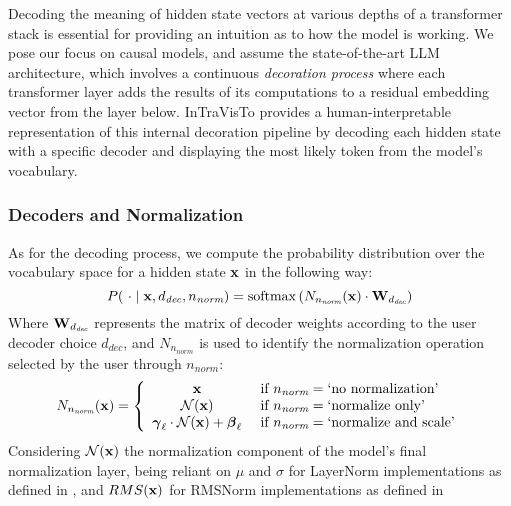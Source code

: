 Decoding the meaning of hidden state vectors at various depths of a transformer stack is essential for providing an intuition as to how the model is working.
We pose our focus on causal models, and assume the state-of-the-art LLM architecture, which involves a continuous \emph{decoration process} where each transformer layer adds the results of its computations to a residual embedding vector from the layer below.
InTraVisTo provides a human-interpretable representation of this internal decoration pipeline by decoding each hidden state with a specific decoder and displaying the most likely token from the model's vocabulary.

\subsubsection{Decoders and Normalization}

As for the decoding process, we compute the probability distribution over the vocabulary space for a hidden state $\bm{\mathbf{x}}$ in the following way:
\begin{equation}
    \label{eq:method_intravisto_decoding}
    P(\ \cdot \mid \bm{\mathbf{x}}, d_\textit{dec}, n_\textit{norm}) = \mathrm{softmax}\left(N_{n_\textit{norm}}(\bm{\mathbf{x}}) \cdot \bm{\mathbf{W}}_{d_\textit{dec}}\right)
\end{equation}
Where $\bm{\mathbf{W}}_{d_\textit{dec}}$ represents the matrix of decoder weights according to the user decoder choice $d_\textit{dec}$, and $N_{n_\textit{norm}}$ is used to identify the normalization operation selected by the user through $n_\textit{norm}$:
\begin{equation}
    N_{n_\textit{norm}}(\bm{\mathbf{x}}) = 
    \label{eq:method_intravisto_normalization}
    \left\{
    \begin{array}{cl}
        \bm{\mathbf{x}} &\ \text{if}\ n_\textit{norm} = \text{`no normalization'} \\
        \mathcal{N}{(\bm{\mathbf{x}})} &\ \text{if}\ n_\textit{norm} = \text{`normalize only'} \\
        \bm{\mathbf{\gamma}}_\ell \cdot \mathcal{N}{(\bm{\mathbf{x}})} + \bm{\mathbf{\beta}}_\ell &\ \text{if}\ n_\textit{norm} = \text{`normalize and scale'}
    \end{array}
    \right.
\end{equation}
Considering $\mathcal{N}{(\bm{\mathbf{x}})}$ the normalization component of the model's final normalization layer, being reliant on $\mu$ and $\sigma$ for LayerNorm implementations as defined in , and $RMS(\bm{\mathbf{x}})$ for RMSNorm implementations as defined in 

